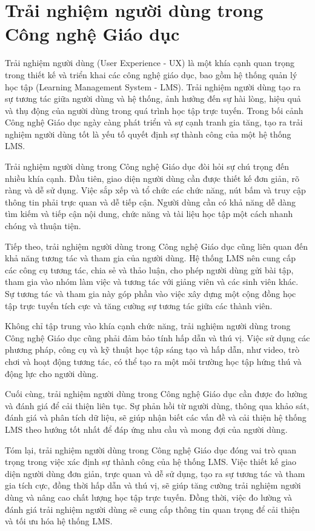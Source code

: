 \documentclass[../Thesis.tex]{subfiles}
\begin{document}
\section{Trải nghiệm người dùng trong Công nghệ Giáo dục}
	Trải nghiệm người dùng (User Experience - UX) là một khía cạnh quan trọng trong thiết kế và triển khai các công nghệ giáo dục, bao gồm hệ thống quản lý học tập (Learning Management System - LMS). Trải nghiệm người dùng tạo ra sự tương tác giữa người dùng và hệ thống, ảnh hưởng đến sự hài lòng, hiệu quả và thụ động của người dùng trong quá trình học tập trực tuyến. Trong bối cảnh Công nghệ Giáo dục ngày càng phát triển và sự cạnh tranh gia tăng, tạo ra trải nghiệm người dùng tốt là yếu tố quyết định sự thành công của một hệ thống LMS.

	Trải nghiệm người dùng trong Công nghệ Giáo dục đòi hỏi sự chú trọng đến nhiều khía cạnh. Đầu tiên, giao diện người dùng cần được thiết kế đơn giản, rõ ràng và dễ sử dụng. Việc sắp xếp và tổ chức các chức năng, nút bấm và truy cập thông tin phải trực quan và dễ tiếp cận. Người dùng cần có khả năng dễ dàng tìm kiếm và tiếp cận nội dung, chức năng và tài liệu học tập một cách nhanh chóng và thuận tiện.

	Tiếp theo, trải nghiệm người dùng trong Công nghệ Giáo dục cũng liên quan đến khả năng tương tác và tham gia của người dùng. Hệ thống LMS nên cung cấp các công cụ tương tác, chia sẻ và thảo luận, cho phép người dùng gửi bài tập, tham gia vào nhóm làm việc và tương tác với giảng viên và các sinh viên khác. Sự tương tác và tham gia này góp phần vào việc xây dựng một cộng đồng học tập trực tuyến tích cực và tăng cường sự tương tác giữa các thành viên.

	Không chỉ tập trung vào khía cạnh chức năng, trải nghiệm người dùng trong Công nghệ Giáo dục cũng phải đảm bảo tính hấp dẫn và thú vị. Việc sử dụng các phương pháp, công cụ và kỹ thuật học tập sáng tạo và hấp dẫn, như video, trò chơi và hoạt động tương tác, có thể tạo ra một môi trường học tập hứng thú và động lực cho người dùng.

	Cuối cùng, trải nghiệm người dùng trong Công nghệ Giáo dục cần được đo lường và đánh giá để cải thiện liên tục. Sự phản hồi từ người dùng, thông qua khảo sát, đánh giá và phân tích dữ liệu, sẽ giúp nhận biết các vấn đề và cải thiện hệ thống LMS theo hướng tốt nhất để đáp ứng nhu cầu và mong đợi của người dùng.

	Tóm lại, trải nghiệm người dùng trong Công nghệ Giáo dục đóng vai trò quan trọng trong việc xác định sự thành công của hệ thống LMS. Việc thiết kế giao diện người dùng đơn giản, trực quan và dễ sử dụng, tạo ra sự tương tác và tham gia tích cực, đồng thời hấp dẫn và thú vị, sẽ giúp tăng cường trải nghiệm người dùng và nâng cao chất lượng học tập trực tuyến. Đồng thời, việc đo lường và đánh giá trải nghiệm người dùng sẽ cung cấp thông tin quan trọng để cải thiện và tối ưu hóa hệ thống LMS.
\end{document}
